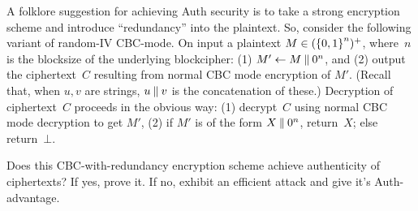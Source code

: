 \documentclass[11pt]{article}
\begin{document}
A folklore suggestion for achieving Auth security is to take a strong
encryption scheme and introduce ``redundancy'' into the plaintext.
So, consider the following variant of random-IV CBC-mode.
On input a plaintext $M \in ({\{0,1\}}^n)^+$, where~$n$ is the blocksize
of the underlying blockcipher: (1) $M' \gets M \:\|\: 0^n$, and (2)
output the ciphertext~$C$ resulting from normal CBC mode encryption of
$M'$. (Recall that, when $u,v$ are strings, $u \:\|\: v$ is the
concatenation of these.)  Decryption of ciphertext~$C$ proceeds in the obvious way: 
(1) decrypt~$C$ using normal CBC mode decryption to get $M'$, 
(2) if $M'$ is of the form $X \:\|\: 0^n$, return~$X$; else
return~$\bot$.

Does this CBC-with-redundancy encryption scheme achieve authenticity
of ciphertexts?  If yes, prove it.  If no, exhibit an efficient attack
and give it's Auth-advantage.
\end{document}
